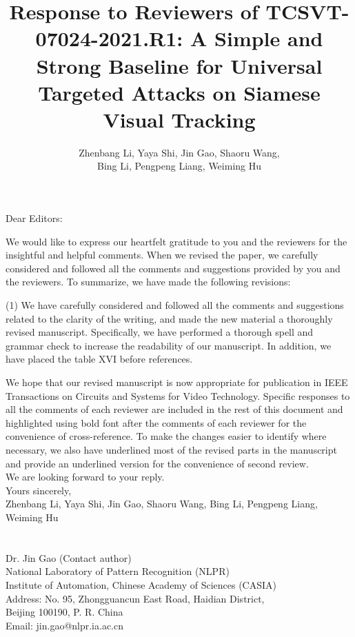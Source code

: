\documentclass[12pt]{article}
\begin{document}
\linespread{1}
\title{Response to Reviewers of TCSVT-07024-2021.R1: A Simple and Strong Baseline for Universal Targeted Attacks on Siamese Visual Tracking}
\author{Zhenbang Li, Yaya Shi, Jin Gao, Shaoru Wang, \\Bing Li, Pengpeng Liang, Weiming Hu}
\date{}
\maketitle

\noindent Dear Editors:

We would like to express our heartfelt gratitude to you and the reviewers for the insightful and helpful comments. When we revised the paper, we carefully considered and followed all the comments and suggestions provided by you and the reviewers. To summarize, we have made the following revisions:

(1) We have carefully considered and followed all the comments and suggestions related to the clarity of the writing, and made the new material a thoroughly revised manuscript. Specifically, we have performed a thorough spell and grammar check to increase the readability of our manuscript. In addition, we have placed the table XVI before references.

We hope that our revised manuscript is now appropriate for publication in IEEE Transactions on Circuits and Systems for Video Technology. Specific responses to all the comments of each reviewer are included in the rest of this document and highlighted using bold font after the comments of each reviewer for the convenience of cross-reference. To make the changes easier to identify where necessary, we also have underlined most of the revised parts in the manuscript and provide an underlined version for the convenience of second review.\\[10pt]
\indent We are looking forward to your reply.\\[10pt]
\noindent Yours sincerely,\\
\noindent Zhenbang Li, Yaya Shi, Jin Gao, Shaoru Wang, Bing Li, Pengpeng Liang, Weiming Hu
\\
\\
\\
\noindent Dr. Jin Gao (Contact author)\\
\noindent National Laboratory of Pattern Recognition (NLPR)\\
\noindent Institute of Automation, Chinese Academy of Sciences (CASIA)\\
\noindent Address: No. 95, Zhongguancun East Road, Haidian District,\\
\noindent Beijing 100190, P. R. China\\
\noindent Email: jin.gao@nlpr.ia.ac.cn
\end{document}
